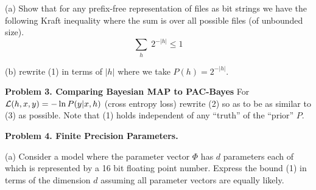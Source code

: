\documentclass{article}
\newcommand{\solution}[1]{}
\begin{document}
\medskip
(a) Show that for any prefix-free representation of files as bit strings we have
the following Kraft inequality where the sum is over all possible files (of unbounded size).
$$\sum_h\;2^{-|h|} \leq 1$$

\solution{Consider a probabilistic process which flips an unbiased coin to determine a next bit until it generates a legal file bit string at which point
  it outputs that file.  This process generates file $h$ with probability $2^{-|h|}$ and, by the prefix-free property, all files can be generated by this process.
  However, it is possible that this process never terminates 
  The Kraft inequality then follows from $\sum_h P(h) \leq 1$ where we also have $P(\mathrm{divergence}) + \sum_h\;P(h) = 1$.
}

\medskip
(b) rewrite (1) in terms of $|h|$ where we take $P(h) = 2^{-|h|}$.

\solution{
  $${\cal L}(h) \leq \frac{10}{9}\parens{\hat{\cal L}(h) + \frac{5 L_\mathrm{max}}{N_{\mathrm{train}}}\parens{(\ln 2)|h| + \ln\frac{1}{\delta}}} \;\;\;(1)$$
}

\medskip
{\bf Problem 3. Comparing Bayesian MAP to PAC-Bayes}
For ${\cal L}(h,x,y) = - \ln P(y|x,h)$ (cross entropy loss) rewrite (2) so as to be as similar to (3) as possible.
Note that (1) holds independent of any ``truth'' of the ``prior'' $P$.

\solution{
  \begin{eqnarray*}
    & & \argmin_h \;\left(\frac{1}{N} \sum_{(x,y)\sim \mathrm{Train}}\;-\ln P(y|x,h)\right) + \frac{5\lmax}{N} \ln\frac{1}{P(h)} \\
    \\
    & =  & \argmax_h \;\left(\frac{1}{N} \sum_{(x,y)\sim \mathrm{Train}}\;\ln P(y|x,h)\right) + \frac{5\lmax}{N} \ln P(h) \\
    \\
    & =  & \argmax_h \left(\sum_{(x,y)\sim \mathrm{Train}}\;\ln P(y|x,h)\right) + 5\lmax \ln P(h) \\
    \\
    & =  & \argmax_h \ln \left(P(h)^{5\lmax}\prod_{(x,y)\sim \mathrm{Train}}\; P(y|x,h)\right) \\
    \\
    & = & \argmax_h\;  P(h)^{5\lmax}\prod_{(x,y)\sim \mathrm{Train}}\; P(y|x,h)
  \end{eqnarray*}
}

\bigskip
{\bf Problem 4. Finite Precision Parameters.}

\medskip
(a) Consider a model where the parameter vector $\Phi$ has $d$ parameters each of which is represented by a 16 bit floating point number.
Express the bound (1) in terms of the dimension $d$ assuming all parameter vectors are equally likely.
\end{document}
